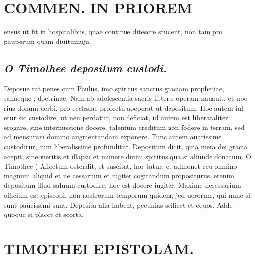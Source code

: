 \documentclass{article}
\begin{document}
\begin{pages}
\section*{COMMEN. IN PRIOREM }
\marginpar{[ p.186 ]}\pstart ensus ut fit in hospitalibus, quae continue ditescre student, non tam pro pauperum quam diuitumuju.  \pend
{}
{}
\subsection*{\textit{O Timothee depositum custodi. }}\pstart Deposue rat penes cum Paulus, imo spiritus sanctus graciam prophetiae, sanaeque ; doctrinae. Nam ab adolescentia sacris litteris operam nauauit, et ube rius donum uerbi, pro ecclesiae profectu aoeperat ut depositum, Hoc autem iul etur sic custodire, ut nen perdatur, non deficiat, id autem est liberaraliter erogare, sine internussione docere, talentum creditum non fodere in terram, sed ad mensuram domino augmentandam exponere. Tunc autem auarissime custoditur, cum liberalissime profunditur.  \pend\pstart Depositum dicit, quia mera dei gracia acepit, sine meritis et illapsu et munere diuini spiritus qua si aliunde donatum.  \pend\pstart O Timothee ) Affectum ostendit, et suscitat, hor tatur, et admonet ceu omnino magnum aliquid et ne cessarium et iugiter cogitandum propositurus, etenim depositum illud saluum custodire, hoc est docere iugiter. Maxime necessarium officium est episcopi, non nostrorum temporum quidem, jed uerorum, qui nunc si sunt paucissimi sunt. Deposita alia habent, pecunias scilicet et equos. Adde quoque si placet et scorta.  \pend
\section*{TIMOTHEI EPISTOLAM. }
\marginpar{[ p.187 ]}
{}

\end{pages}
\end{document}
